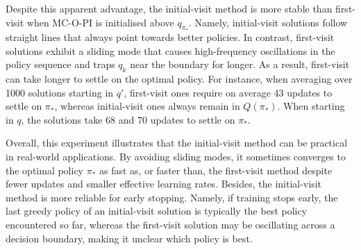 \documentclass[twoside,11pt]{article}
\newcommand{\region}{\graval}
\newcommand{\pol}{\pi}
\newcommand{\qval}{q}
\newcommand{\qopt}{\qval_{\best{\pol}}}
\newcommand{\graval}{Q}
\newcommand{\best}[1]{{#1}_*}
\begin{document}
Despite this apparent advantage, the initial-visit method is more stable than first-visit when MC-O-PI is initialised above $\qopt$.
Namely, initial-visit solutions follow straight lines that always point towards better policies.
In contrast, first-visit solutions exhibit a sliding mode that causes high-frequency oscillations in the policy sequence and traps $q_k$ near the boundary for longer.
As a result, first-visit can take longer to settle on the optimal policy.
For instance, when averaging over 1000 solutions starting in $q'$, first-visit ones require on average 43 updates to settle on $\pi_*$, whereas initial-visit ones always remain in $\region(\best{\pi})$.
When starting in $q$, the solutions take 68 and 70 updates to settle on $\pi_*$.


Overall, this experiment illustrates that the initial-visit method can be practical in real-world applications. 
By avoiding sliding modes, it sometimes converges to the optimal policy $\best{\pi}$ as fast as, or faster than, the first-visit method despite fewer updates and smaller effective learning rates.
Besides, the initial-visit method is more reliable for early stopping. Namely, if training stops early, the last greedy policy of an initial-visit solution is typically the best policy encountered so far, whereas the first-visit solution may be oscillating across a decision boundary, making it unclear which policy is best.




\end{document}
